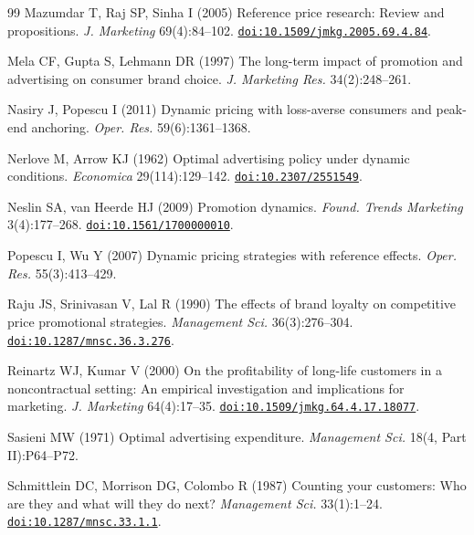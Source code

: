 \begin{thebibliography}{99}
Mazumdar T, Raj SP, Sinha I (2005) Reference price research: Review and propositions. \emph{J. Marketing} 69(4):84--102. \href{https://doi.org/10.1509/jmkg.2005.69.4.84}{\nolinkurl{doi:10.1509/jmkg.2005.69.4.84}}.

Mela CF, Gupta S, Lehmann DR (1997) The long-term impact of promotion and advertising on consumer brand choice. \emph{J. Marketing Res.} 34(2):248--261.

Nasiry J, Popescu I (2011) Dynamic pricing with loss-averse consumers and peak-end anchoring. \emph{Oper. Res.} 59(6):1361--1368.

\begingroup\color{blue}
Nerlove M, Arrow KJ (1962) Optimal advertising policy under dynamic conditions. \emph{Economica} 29(114):129--142. \href{https://doi.org/10.2307/2551549}{\nolinkurl{doi:10.2307/2551549}}.
\par\endgroup

Neslin SA, van Heerde HJ (2009) Promotion dynamics. \emph{Found. Trends Marketing} 3(4):177--268. \href{https://doi.org/10.1561/1700000010}{\nolinkurl{doi:10.1561/1700000010}}.


Popescu I, Wu Y (2007) Dynamic pricing strategies with reference effects. \emph{Oper. Res.} 55(3):413--429.

Raju JS, Srinivasan V, Lal R (1990) The effects of brand loyalty on competitive price promotional strategies. \emph{Management Sci.} 36(3):276--304. \href{https://doi.org/10.1287/mnsc.36.3.276}{\nolinkurl{doi:10.1287/mnsc.36.3.276}}.

Reinartz WJ, Kumar V (2000) On the profitability of long-life customers in a noncontractual setting: An empirical investigation and implications for marketing. \emph{J. Marketing} 64(4):17--35. \href{https://doi.org/10.1509/jmkg.64.4.17.18077}{\nolinkurl{doi:10.1509/jmkg.64.4.17.18077}}.


 {\color{black} Sasieni MW (1971) Optimal advertising expenditure. \emph{Management Sci.} 18(4, Part II):P64--P72.}

Schmittlein DC, Morrison DG, Colombo R (1987) Counting your customers: Who are they and what will they do next? \emph{Management Sci.} 33(1):1--24. \href{https://doi.org/10.1287/mnsc.33.1.1}{\nolinkurl{doi:10.1287/mnsc.33.1.1}}.


\end{thebibliography}
